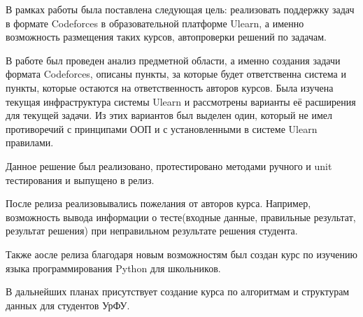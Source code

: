 \Conclusion %

В рамках работы была поставлена следующая цель: реализовать поддержку задач в формате Codeforces в образовательной платформе Ulearn, а именно возможность размещения таких курсов, автопроверки решений по задачам.

В работе был проведен анализ предметной области, а именно создания задачи формата Codeforces, описаны пункты, за которые будет ответственна система и пункты, которые остаются на ответственность авторов курсов. Была изучена текущая инфраструктура системы Ulearn и рассмотрены варианты её расширения для текущей задачи. Из этих вариантов был выделен один, который не имел противоречий с принципами ООП и с установленными в системе Ulearn правилами. 

Данное решение был реализовано, протестировано методами ручного и unit тестирования и выпущено в релиз.

После релиза реализовывались пожелания от авторов курса. Например, возможность вывода информации о тесте(входные данные, правильные результат, результат решения) при неправильном результате решения студента. 

Также аосле релиза благодаря новым возможностям был создан курс по изучению языка программирования Python для школьников.

В дальнейших планах присутствует создание курса по алгоритмам и структурам данных для студентов УрФУ.



